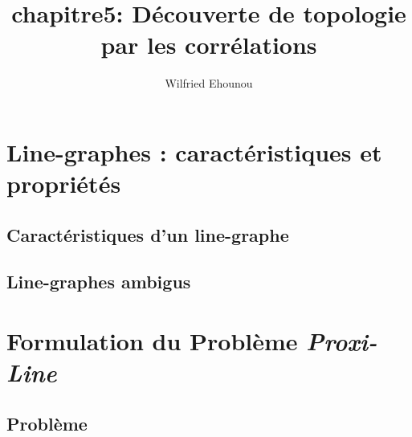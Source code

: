 \documentclass[onecolumn, 12pt]{book}
\title{chapitre5: D\'ecouverte de topologie par les corr\'elations}
\author{Wilfried Ehounou}
\date{\oldstylenums{\today}}
\begin{document}
\maketitle
\label{linegraphesChapitre}


\section{Line-graphes : caract\'eristiques et propri\'et\'es}
	
	
	\subsection{Caract\'eristiques d'un line-graphe}
		

	\subsection{Line-graphes ambigus}
		


\section{Formulation du Probl\`eme {\em Proxi-Line}}

	

	\subsection{Probl\`eme}
		

%		
\end{document}
